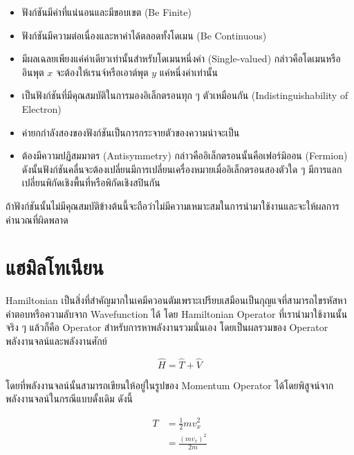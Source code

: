 \begin{itemize}[topsep=0pt]
    \item ฟังก์ชันมีค่าที่แน่นอนและมีขอบเขต (Be Finite)

    \item ฟังก์ชันมีความต่อเนื่องและหาค่าได้ตลอดทั้งโดเมน (Be Continuous)

    \item มีผลเฉลยเพียงแค่ค่าเดียวเท่านั้นสำหรับโดเมนหนึ่งค่า (Single-valued) กล่าวคือโดเมนหรืออินพุต $x$ จะต้องให้เรนจ์หรือเอาต์พุต
          $y$ แค่หนึ่งค่าเท่านั้น

    \item เป็นฟังก์ชันที่มีคุณสมบัติในการมองอิเล็กตรอนทุก ๆ ตัวเหมือนกัน (Indistinguishability of Electron)

    \item ค่ายกกำลังสองของฟังก์ชันเป็นการกระจายตัวของความน่าจะเป็น

    \item ต้องมีความปฏิสมมาตร (Antisymmetry) กล่าวคืออิเล็กตรอนนั้นคือเฟอร์มิออน (Fermion)\autocite{atkins2010}
          ดังนั้นฟังก์ชันคลื่นจะต้องเปลี่ยนมีการเปลี่ยนเครื่องหมายเมื่ออิเล็กตรอนสองตัวใด ๆ มีการแลกเปลี่ยนพิกัดเชิงพื้นที่หรือพิกัดเชิงสปินกัน
\end{itemize}

ถ้าฟังก์ชันนั้นไม่มีคุณสมบัติข้างต้นนี้จะถือว่าไม่มีความเหมาะสมในการนำมาใช้งานและจะให้ผลการคำนวณที่ผิดพลาด

\section{แฮมิลโทเนียน}
\label{sec:hamiltonian}

Hamiltonian เป็นสิ่งที่สำคัญมากในเคมีควอนตัมเพราะเปรียบเสมือนเป็นกุญแจที่สามารถไขรหัสหาคำตอบหรือความลับจาก Wavefunction ได้
โดย Hamiltonian Operator ที่เรานำมาใช้งานนั้นจริง ๆ แล้วก็คือ Operator สำหรับการหาพลังงานรวมนั่นเอง โดยเป็นผลรวมของ Operator
พลังงานจลน์และพลังงานศักย์

\begin{equation}\label{eq:hamil}
    \hat{H} = \hat{T} + \hat{V}
\end{equation}

\noindent โดยที่พลังงานจลน์นั้นสามารถเขียนให้อยู่ในรูปของ Momentum Operator ได้โดยพิสูจน์จากพลังงานจลน์ในกรณีแบบดั้งเดิม ดังนี้

\begin{align}
    T & = \frac{1}{2}mv^{2}_{x}   \\
      & = \frac{(mv_{x})^{2}}{2m}
\end{align}

